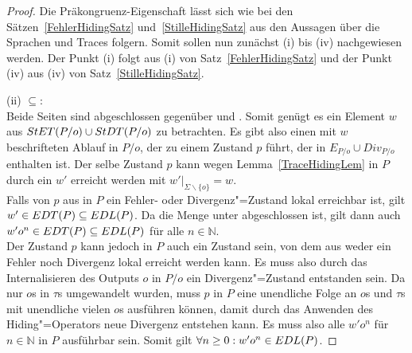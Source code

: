 \begin{proof}
  Die Präkongruenz-Eigenschaft lässt sich wie bei den
  Sätzen~\ref{FehlerHidingSatz} und~\ref{StilleHidingSatz} aus den Aussagen
  über die Sprachen und Traces folgern. Somit sollen nun zunächst (i) bis (iv)
  nachgewiesen werden. Der Punkt (i) folgt aus (i) von
  Satz~\ref{FehlerHidingSatz} und der Punkt (iv) aus (iv) von
  Satz~\ref{StilleHidingSatz}.

  (ii) \glqq $\subseteq$\grqq{}:\\
  Beide Seiten sind abgeschlossen gegenüber \prune{} und \cont{}. Somit genügt
  es ein Element $w$ aus $StET (P/o)\cup StDT (P/o)$ zu betrachten. Es gibt
  also einen mit $w$ beschrifteten Ablauf in $P/o$, der zu einem Zustand $p$
  führt, der in $E_{P/o}\cup Div_{P/o}$ enthalten ist. Der selbe Zustand $p$
  kann wegen Lemma~\ref{TraceHidingLem} in $P$ durch ein $w'$ erreicht werden
  mit $w'|_{\Sigma\backslash\{o\}} = w$.\\
  Falls von $p$ aus in $P$ ein Fehler- oder Divergenz"=Zustand lokal erreichbar
  ist, gilt $w'\in EDT (P)\subseteq EDL (P)$. Da die Menge \EDL{} unter
  \cont{} abgeschlossen ist, gilt dann auch $w'o^n\in EDT (P)\subseteq EDL (P)$
  für alle $n\in\mathbb{N}$.\\
  Der Zustand $p$ kann jedoch in $P$ auch ein Zustand sein, von dem aus weder
  ein Fehler noch Divergenz lokal erreicht werden kann. Es muss also durch das
  Internalisieren des Outputs $o$ in $P/o$ ein Divergenz"=Zustand entstanden
  sein. Da nur $o$s in $\tau$s umgewandelt wurden, muss $p$ in $P$ eine
  unendliche Folge an $o$s und $\tau$s mit unendliche vielen $o$s ausführen
  können, damit durch das Anwenden des Hiding"=Operators neue Divergenz
  entstehen kann. Es muss also alle $w'o^n$ für $n\in\mathbb{N}$ in $P$
  ausführbar sein. Somit gilt $\forall n\geq 0: w'o^n\in EDL (P)$.


\end{proof}
